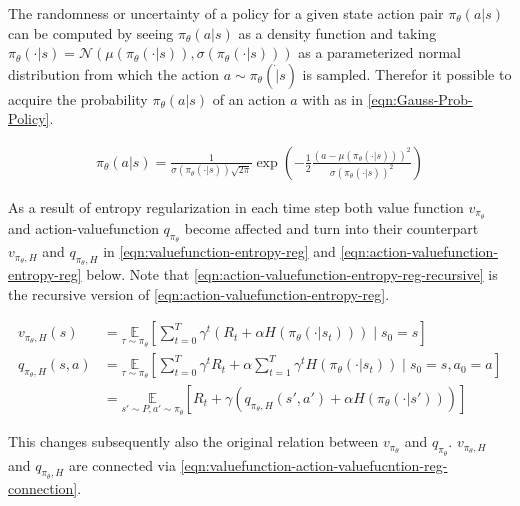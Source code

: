 The randomness or uncertainty of a policy for a given state action pair $\pi_\theta(a|s)$ can be computed  by seeing  $\pi_\theta(a|s)$ as a density function and taking $\pi_\theta(\cdot|s) = \mathcal{N}\left(\mu(\pi_\theta(\cdot|s)), \sigma(\pi_\theta(\cdot|s))\right)$ as a parameterized normal distribution from which the action $a \sim \pi_\theta(\dot|s)$ is sampled. Therefor it possible to acquire the probability $\pi_\theta(a|s)$ of an action $a$ with as in \eqref{eqn:Gauss-Prob-Policy}.

\begin{align}
	\pi_\theta(a|s) = \frac{1}{\sigma(\pi_\theta(\cdot|s)) \sqrt{2\pi}} \exp\left(-\frac{1}{2}\frac{(a -\mu(\pi_\theta(\cdot|s)))^2}{\sigma(\pi_\theta(\cdot|s))^2}\right) \label{eqn:Gauss-Prob-Policy}
\end{align}

As a result of entropy regularization in each time step both value function $v_{\pi_\theta}$ and action-valuefunction $q_{\pi_\theta}$ become affected and turn into their counterpart $v_{\pi_\theta, H}$ and $q_{\pi_\theta, H}$ in \eqref{eqn:valuefunction-entropy-reg} and \eqref{eqn:action-valuefunction-entropy-reg} below.  Note that \eqref{eqn:action-valuefunction-entropy-reg-recursive} is the recursive version of \eqref{eqn:action-valuefunction-entropy-reg}.

\begin{align}
	v_{\pi_\theta, H}(s) &= \underset{\tau\sim\pi_\theta}{\mathbb{E}}\left[\sum_{t=0}^T\gamma^t\left(R_t + \alpha H(\pi_\theta(\cdot|s_t))\right)\mid s_0 = s\right]\label{eqn:valuefunction-entropy-reg} \\
	q_{\pi_\theta, H}(s, a) &= \underset{\tau\sim\pi_\theta}{\mathbb{E}}\left[\sum_{t=0}^T\gamma^t R_t + \alpha \sum_{t=1}^T \gamma^t H(\pi_\theta(\cdot|s_t))\mid s_0 = s, a_0=a\right]\label{eqn:action-valuefunction-entropy-reg} \\
	&= \underset{s'\sim P, a' \sim \pi_\theta}{\mathbb{E}}\left[R_t + \gamma (q_{\pi_\theta, H}(s', a') + \alpha H(\pi_\theta(\cdot|s')))\right]\label{eqn:action-valuefunction-entropy-reg-recursive} 
\end{align} 

This changes subsequently also the original relation between $v_{\pi_\theta}$ and $q_{\pi_\theta}$. $v_{\pi_\theta, H}$ and $q_{\pi_\theta, H}$ are connected via \eqref{eqn:valuefunction-action-valuefucntion-reg-connection}.

